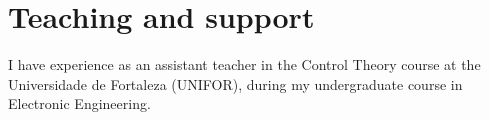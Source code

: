 \section{Teaching and support}
I have experience as an assistant teacher in the Control Theory course at the Universidade de Fortaleza (UNIFOR), during my undergraduate course in Electronic Engineering.